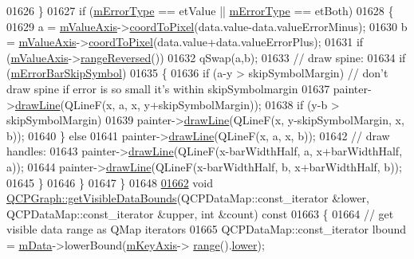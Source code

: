 \begin{DoxyCode}
01626     \}
01627     \textcolor{keywordflow}{if} (\hyperlink{a00031_a29e64273db201aeadebc61c870720a36}{mErrorType} == etValue || \hyperlink{a00031_a29e64273db201aeadebc61c870720a36}{mErrorType} == etBoth)
01628     \{
01629       a = \hyperlink{a00024_acfc46d619ab9598be33b64146da45822}{mValueAxis}->\hyperlink{a00025_a985ae693b842fb0422b4390fe36d299a}{coordToPixel}(data.value-data.valueErrorMinus);
01630       b = \hyperlink{a00024_acfc46d619ab9598be33b64146da45822}{mValueAxis}->\hyperlink{a00025_a985ae693b842fb0422b4390fe36d299a}{coordToPixel}(data.value+data.valueErrorPlus);
01631       \textcolor{keywordflow}{if} (\hyperlink{a00024_acfc46d619ab9598be33b64146da45822}{mValueAxis}->\hyperlink{a00025_ade26dc7994ccd8a11f64fd83377ee021}{rangeReversed}())
01632         qSwap(a,b);
01633       \textcolor{comment}{// draw spine:}
01634       \textcolor{keywordflow}{if} (\hyperlink{a00031_acf631d7dbd1055a69ab3b63094868557}{mErrorBarSkipSymbol})
01635       \{
01636         \textcolor{keywordflow}{if} (a-y > skipSymbolMargin) \textcolor{comment}{// don't draw spine if error is so small it's within skipSymbolmargin}
01637           painter->\hyperlink{a00047_a0b4b1b9bd495e182c731774dc800e6e0}{drawLine}(QLineF(x, a, x, y+skipSymbolMargin));
01638         \textcolor{keywordflow}{if} (y-b > skipSymbolMargin)
01639           painter->\hyperlink{a00047_a0b4b1b9bd495e182c731774dc800e6e0}{drawLine}(QLineF(x, y-skipSymbolMargin, x, b));
01640       \} \textcolor{keywordflow}{else}
01641         painter->\hyperlink{a00047_a0b4b1b9bd495e182c731774dc800e6e0}{drawLine}(QLineF(x, a, x, b));
01642       \textcolor{comment}{// draw handles:}
01643       painter->\hyperlink{a00047_a0b4b1b9bd495e182c731774dc800e6e0}{drawLine}(QLineF(x-barWidthHalf, a, x+barWidthHalf, a));
01644       painter->\hyperlink{a00047_a0b4b1b9bd495e182c731774dc800e6e0}{drawLine}(QLineF(x-barWidthHalf, b, x+barWidthHalf, b));
01645     \}
01646   \}
01647 \}
01648 
\hypertarget{a00115_source_l01662}{}\hyperlink{a00031_a8963c90087cf53b889b29dd59aa41aad}{01662} \textcolor{keywordtype}{void} \hyperlink{a00031_a8963c90087cf53b889b29dd59aa41aad}{QCPGraph::getVisibleDataBounds}(QCPDataMap::const\_iterator &lower, 
      QCPDataMap::const\_iterator &upper, \textcolor{keywordtype}{int} &count)\textcolor{keyword}{ const}
01663 \textcolor{keyword}{}\{
01664   \textcolor{comment}{// get visible data range as QMap iterators}
01665   QCPDataMap::const\_iterator lbound = \hyperlink{a00031_a8457c840f69a0ac49f61d30a509c5d08}{mData}->lowerBound(\hyperlink{a00024_a692421b963472fa6e16156a74ba96832}{mKeyAxis}->
      \hyperlink{a00025_ab1ea79a4f5ea4cf42620f8f51c477ac4}{range}().\hyperlink{a00049_aa3aca3edb14f7ca0c85d912647b91745}{lower});

\end{DoxyCode}
